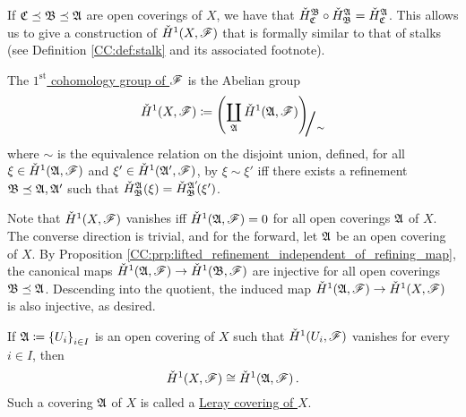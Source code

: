 \documentclass[../Moduli_Spaces_of_Riemann_Surfaces.tex]{subfiles}
\begin{document}
    \begin{remark}
        If $\mathfrak{C}\preceq\mathfrak{B}\preceq\mathfrak{A}$ are open coverings of $X$, we have that $\check{H}^{\mathfrak{B}}_{\mathfrak{C}}\circ\check{H}^{\mathfrak{A}}_{\mathfrak{B}}=\check{H}^{\mathfrak{A}}_{\mathfrak{C}}$. This allows us to give a construction of $\check{H}^1\!\left(X,\mathscr{F}\right)$ that is formally similar to that of stalks (see Definition \ref{CC:def:stalk} and its associated footnote).\exqed
    \end{remark}
    \begin{definition}
        The \ul{$1^\textrm{st}$ cohomology group of $\mathscr{F}$} is the Abelian group
        \begin{equation*}
            \check{H}^1\!\l(X,\ms{F}\r)\coloneqq\raisebox{-2pt}{$\Biggl(\!$}\coprod_{\mf{A}}\check{H}^1\!\l(\mf{A},\ms{F}\r)\!\raisebox{-2pt}{$\Biggr)$}\!\!_{\scalebox{2}{/}\sim}
        \end{equation*}
        where $\sim$ is the equivalence relation on the disjoint union, defined, for all $\xi\in\check{H}^1\!\left(\mathfrak{A},\mathscr{F}\right)$ and $\xi'\in\check{H}^1\!\left(\mathfrak{A}',\mathscr{F}\right)$, by $\xi\sim\xi'$ iff there exists a refinement $\mathfrak{B}\preceq\mathfrak{A},\mathfrak{A}'$ such that $\check{H}^{\mathfrak{A}}_{\mathfrak{B}}\!\left(\xi\right)=\check{H}^{\mathfrak{A}'}_{\mathfrak{B}}\!\!\left(\xi'\right)$.
    \end{definition}
    \begin{remark}
        Note that $\check{H}^1\!\left(X,\mathscr{F}\right)$ vanishes iff $\check{H}^1\!\left(\mathfrak{A},\mathscr{F}\right)=0$ for all open coverings $\mathfrak{A}$ of $X$. The converse direction is trivial, and for the forward, let $\mathfrak{A}$ be an open covering of $X$. By Proposition \ref{CC:prp:lifted_refinement_independent_of_refining_map}, the canonical maps $\check{H}^1\!\left(\mathfrak{A},\mathscr{F}\right)\to\check{H}^1\!\left(\mathfrak{B},\mathscr{F}\right)$ are injective for all open coverings $\mathfrak{B}\preceq\mathfrak{A}$. Descending into the quotient, the induced map $\check{H}^1\!\left(\mathfrak{A},\mathscr{F}\right)\to\check{H}^1\!\left(X,\mathscr{F}\right)$ is also injective, as desired.\exqed
    \end{remark}
    \begin{proposition}[Leray]\label{CC:prp:leray}
        If $\mathfrak{A}\coloneqq\left\{U_i\right\}_{i\in I}$ is an open covering of $X$ such that $\check{H}^1\!\left(U_i,\mathscr{F}\right)$ vanishes for every $i\in I$, then
        \begin{equation*}
            \check{H}^1\!\left(X,\mathscr{F}\right)\cong\check{H}^1\!\left(\mathfrak{A},\mathscr{F}\right).
        \end{equation*}
        Such a covering $\mathfrak{A}$ of $X$ is called a \ul{Leray covering of $X$}.
    \end{proposition}
\end{document}
